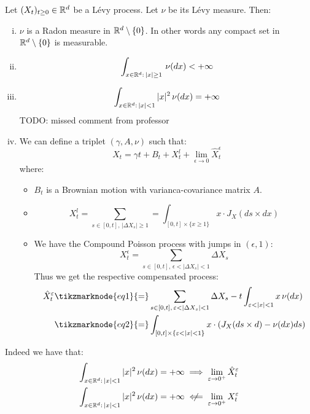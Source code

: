 \begin{definition}
    Let $(X_t)_{t\geq0}\in\mathbb{R}^d$ be a Lévy process. Let $\nu$ be its Lévy measure.
    Then: 
    \begin{enumerate}[i)]
        \item $\nu$ is a Radon measure in $\mathbb{R}^d\setminus\{0\}$. In other words
            any compact set in $\mathbb{R}^d\setminus\{0\}$ is measurable.
        \item \[ \int_{x\in\mathbb{R}^d: \, |x|\geq1} \, \nu(dx) < +\infty \]
        \item \[ \int_{x\in\mathbb{R}^d: \, |x|<1} |x|^2 \, \nu(dx) = +\infty \] TODO: missed comment from professor
        \item We can define a triplet $(\gamma, A, \nu)$ such that:
            \[ X_t = \gamma t + B_t + X_t^l + \lim_{\epsilon\to0}
            \hat{X}_t^{\epsilon} \]
            where:
            \begin{itemize}
                \item $B_t$ is a Brownian motion with varianca-covariance matrix
                    $A$.
                \item \[ X_t^l = \sum_{ s\in [0,t], \, |\Delta X_s| \geq 1} = 
                    \int_{[0,t]\times \{x \geq 1\}} x \cdot J_X(ds \times dx) \]
                \item We have the Compound Poisson process with jumps in 
                $(\epsilon, 1)$:
                \[ X^\epsilon_t = \sum_{s\in[0,t], \, \epsilon < |\Delta X_s| 
                < 1} \Delta X_s \]
                Thus we get the respective compensated process:
                \begin{align*}
                    \hat{X}^\epsilon_t & \tikzmarknode{eq1}{=} \sum_{s\in[0,t],
                    \, \epsilon < |\Delta X_s| < 1} \Delta X_s - t \int_{\epsilon
                    < |x| < 1} x \, \nu(dx) \\
                    & \tikzmarknode{eq2}{=} \int_{[0,t]\times \{\epsilon < |x|
                    < 1\}} x \cdot (J_X(ds \times d) - \nu(dx) ds) 
                \end{align*} 
            \end{itemize}
    \end{enumerate}
Indeed we have that:
\begin{align*}
    \int_{x\in\R^d: \, |x|<1} |x|^2 \, \nu(dx) = +\infty & \implies \lim_{
        \epsilon \to 0^+} \hat{X}^\epsilon_t \\
    \int_{x\in\R^d: \, |x|<1} |x|^2 \, \nu(dx) = +\infty &  \centernot\impliedby
        \lim_{ \epsilon \to 0^+} X^\epsilon_t
\end{align*}
\end{definition}

